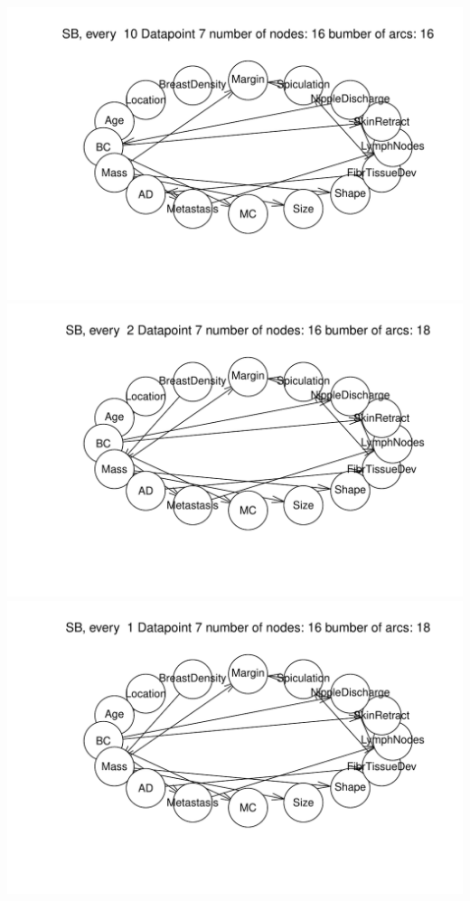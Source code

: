 \documentclass[]{article}
\begin{document}
\includegraphics{BN_Ass2_files/figure-latex/unnamed-chunk-4-1.pdf}
\includegraphics{BN_Ass2_files/figure-latex/unnamed-chunk-4-2.pdf}
\includegraphics{BN_Ass2_files/figure-latex/unnamed-chunk-4-3.pdf}
\end{document}
